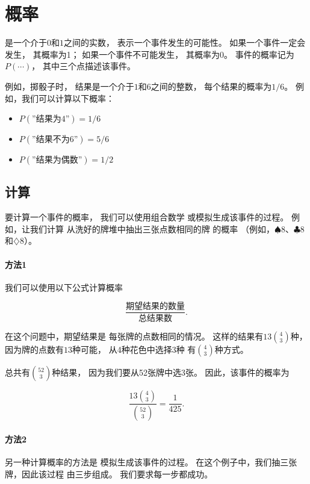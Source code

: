 \chapter{概率}


是一个介于$0$和$1$之间的实数，
表示一个事件发生的可能性。
如果一个事件一定会发生，
其概率为1；
如果一个事件不可能发生，
其概率为0。
事件的概率记为$P(\cdots)$，
其中三个点描述该事件。

例如，掷骰子时，
结果是一个介于$1$和$6$之间的整数，
每个结果的概率为$1/6$。
例如，我们可以计算以下概率：

\begin{itemize}[noitemsep]
\item $P(\textrm{''结果为4''})=1/6$
\item $P(\textrm{''结果不为6''})=5/6$
\item $P(\textrm{''结果为偶数''})=1/2$
\end{itemize}

\section{计算}

要计算一个事件的概率，
我们可以使用组合数学
或模拟生成该事件的过程。
例如，让我们计算
从洗好的牌堆中抽出三张点数相同的牌
的概率
（例如，$\spadesuit 8$、$\clubsuit 8$和$\diamondsuit 8$）。

\subsubsection*{方法1}

我们可以使用以下公式计算概率

\[\frac{\textrm{期望结果的数量}}{\textrm{总结果数}}.\]

在这个问题中，期望结果是
每张牌的点数相同的情况。
这样的结果有$13 {4 \choose 3}$种，
因为牌的点数有$13$种可能，
从4种花色中选择3种
有${4 \choose 3}$种方式。

总共有${52 \choose 3}$种结果，
因为我们要从52张牌中选3张。
因此，该事件的概率为

\[\frac{13 {4 \choose 3}}{{52 \choose 3}} = \frac{1}{425}.\]

\subsubsection*{方法2}

另一种计算概率的方法是
模拟生成该事件的过程。
在这个例子中，我们抽三张牌，因此该过程
由三步组成。
我们要求每一步都成功。

